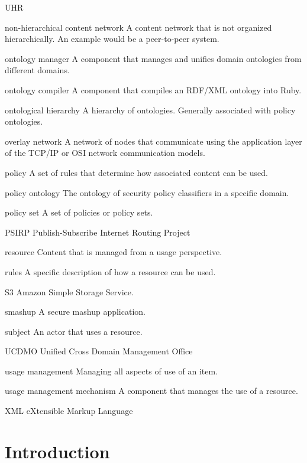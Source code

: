 \documentclass[botnum,fleqn,final]{unmeethesis}
\begin{document}
\begin{glossary}{UHR}
\item[non-hierarchical content network] A content network that is not organized hierarchically.  An example would be a peer-to-peer system.
\item[ontology manager] A component that manages and unifies domain ontologies from different domains.
\item[ontology compiler] A component that compiles an RDF/XML ontology into Ruby.
\item[ontological hierarchy] A hierarchy of ontologies.  Generally associated with policy ontologies.
\item[overlay network] A network of nodes that communicate using the application layer of the TCP/IP or OSI network communication models.
\item[policy] A set of rules that determine how associated content can be used.
\item[policy ontology] The ontology of security policy classifiers in a specific domain.
\item[policy set] A set of policies or policy sets.
\item[PSIRP] Publish-Subscribe Internet Routing Project
\item[resource] Content that is managed from a usage perspective.
\item[rules] A specific description of how a resource can be used.
\item[S3] Amazon Simple Storage Service.
\item[smashup] A secure mashup application.
\item[subject] An actor that uses a resource.
\item[UCDMO] Unified Cross Domain Management Office
\item[usage management] Managing all aspects of use of an item.
\item[usage management mechanism] A component that manages the use of a resource.
\item[XML] eXtensible Markup Language
\end{glossary}

\mainmatter

\chapter{Introduction}







\end{document}
